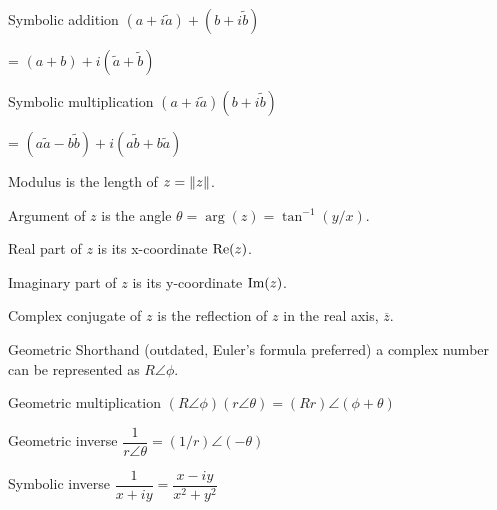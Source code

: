 \begin{card}
    \begin{compactdesc}
    \item[Symbolic addition]
        $(a + i\tilde{a}) + (b + i\tilde{b})$

        = $(a + b) + i(\tilde{a} + \tilde{b})$
    \item[Symbolic multiplication]
        $(a + i\tilde{a}) (b + i\tilde{b})$

        = $(a\tilde{a} - b\tilde{b}) + i(a\tilde{b} + b\tilde{a})$
    \item[Modulus] is the length of $z = \lVert z\rVert$.
    \item[Argument] of $z$ is the angle $\theta = \arg(z) = \tan^{-1}(y/x)$.
    \item[Real part] of $z$ is its x-coordinate $\text{Re}(z)$.
    \item[Imaginary part] of $z$ is its y-coordinate $\text{Im}(z)$.
    \item[Complex conjugate] of $z$ is the reflection of $z$ in the real axis,
        $\overline z$.
    \item[Geometric Shorthand] (outdated, Euler's formula preferred)
        a complex number can be represented as $R \angle \phi$.
    \item[Geometric multiplication] $(R \angle \phi)(r \angle \theta) = (Rr) \angle (\phi + \theta)$
    \item[Geometric inverse] $\dfrac{1}{r \angle \theta} = (1/r) \angle (-\theta)$
    \item[Symbolic inverse] $\dfrac{1}{x + iy} = \dfrac{x - iy}{x^2 + y^2}$
    \end{compactdesc}
\end{card}

